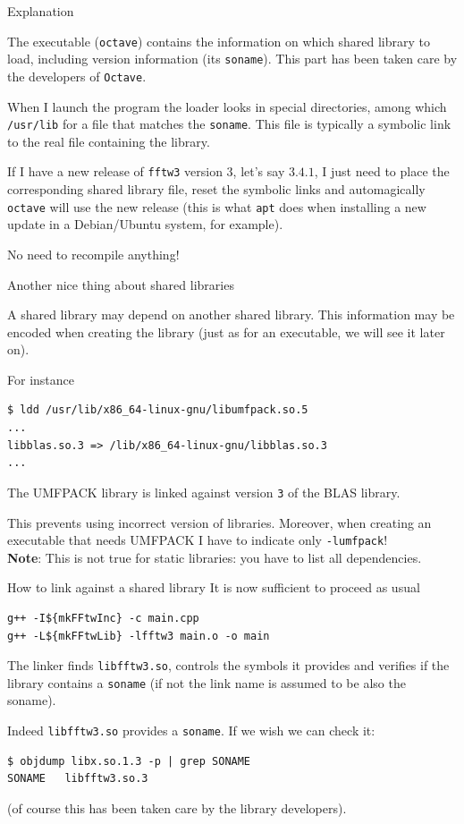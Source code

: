 \documentclass[10pt,aspectratio=169]{beamer}
\begin{document}
\begin{frame}{Explanation}  

  The executable (\texttt{octave}) contains the
  information on which shared library to load, including version
  information (its \texttt{soname}). This part has been taken care by the 
  developers of \texttt{Octave}.
  \smallskip

  When I launch the program the loader looks in special directories,
  among which \texttt{/usr/lib} for a file that matches the
  \texttt{soname}. This file is typically a symbolic link to the real
  file containing the library.  
  \medskip

  If I have a new release of \texttt{fftw3} version 3, let's say $3.4.1$,
  I just need to place the corresponding shared library file, reset the symbolic links and automagically \texttt{octave}
  will use the new release (this is what \texttt{apt} does when
  installing a new update in a Debian/Ubuntu system, for example).

  \smallskip

  No need to recompile anything!
\end{frame}


\begin{frame}[fragile]{Another nice thing about shared libraries} 

  A shared library may depend on another shared library. This information may be encoded  when creating the library
  (just as for an executable, we will see it later on).

  For instance
\begin{verbatim}
$ ldd /usr/lib/x86_64-linux-gnu/libumfpack.so.5
...
libblas.so.3 => /lib/x86_64-linux-gnu/libblas.so.3
...
\end{verbatim}
The UMFPACK library is linked against version
\texttt{3} of the BLAS library. \smallskip

This prevents using incorrect version of
libraries. Moreover, when creating an executable that needs UMFPACK I have to indicate only
\texttt{-lumfpack}! \\
\textbf{Note}: This is not true for static libraries: you have to list all dependencies.
\end{frame}

\begin{frame}[fragile]{How to link against a shared library}   
  It is now sufficient to proceed as usual
\begin{verbatim}
g++ -I${mkFFtwInc} -c main.cpp
g++ -L${mkFFtwLib} -lfftw3 main.o -o main
\end{verbatim}

The linker finds \texttt{libfftw3.so}, controls the symbols it
provides and verifies if the library contains a
\texttt{soname} (if not the link name is assumed to be also the
soname).

Indeed \texttt{libfftw3.so} provides a \texttt{soname}. If we wish we
can check it:
\begin{verbatim}
$ objdump libx.so.1.3 -p | grep SONAME
SONAME   libfftw3.so.3
\end{verbatim}
(of course this has been taken care by the library developers).
\end{frame}
\end{document}
